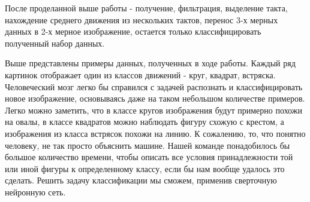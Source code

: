 После проделанной выше работы - получение, фильтрация, выделение такта, нахождение среднего движения из нескольких тактов, перенос 3-х мерных данных в 2-х мерное изображение, остается только классифицировать полученный набор данных. 
\begin{figure}[H]
\end{figure}
Выше представлены примеры данных, полученных в ходе работы. Каждый ряд картинок отображает один из классов движений - круг, квадрат, встряска. Человеческий мозг легко бы справился с задачей распознать и классифицировать новое изображение, основываясь даже на таком небольшом количестве примеров. Легко можно заметить, что в классе кругов изображения будут примерно похожи на овалы, в классе квадратов можно наблюдать фигуру схожую с крестом, а изображения из класса встрясок похожи на линию. К сожалению, то, что понятно человеку, не так просто объяснить машине. Нашей команде понадобилось бы большое количество времени, чтобы описать все условия принадлежности той или иной фигуры к определенному классу, если бы нам вообще удалось это сделать. Решить задачу классификации мы сможем, применив сверточную нейронную сеть.
